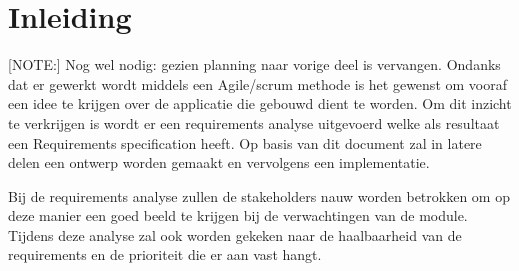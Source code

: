 
\chapter{Inleiding}\label{ch:ReqInl}
[NOTE:] Nog wel nodig: gezien planning naar vorige deel is vervangen.
Ondanks dat er gewerkt wordt middels een Agile/scrum methode is het gewenst om vooraf een idee te krijgen over de applicatie die gebouwd dient te worden. Om dit inzicht te verkrijgen is wordt er een requirements analyse uitgevoerd welke als resultaat een Requirements specification heeft. Op basis van dit document zal in latere delen een ontwerp worden gemaakt en vervolgens een implementatie.

Bij de requirements analyse zullen de stakeholders nauw worden betrokken om op deze manier
een goed beeld te krijgen bij de verwachtingen van de module. Tijdens deze analyse zal ook worden gekeken naar de haalbaarheid van de requirements en de prioriteit die er aan vast hangt.
